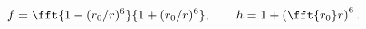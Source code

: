 \begin{equation}
f=\fft{1-(r_0/r)^6}{1+(r_0/r)^6},\qquad h=1+\left(\fft{r_0}r\right)^6.
\label{eq:fhform}
\end{equation}

